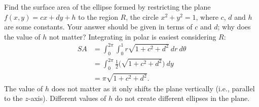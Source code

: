 {Find the surface area of the ellipse formed by restricting the plane $f(x,y) = cx+dy+h$ to the region $R$, the circle $x^2+y^2=1$, where $c$, $d$ and $h$ are some constants. Your answer should be given in terms of $c$ and $d$; why does the value of $h$ not matter?
}
{Integrating in polar is easiest considering $R$:
\begin{align*}SA &= \int_{0}^{2\pi}\int_{0}^{1} r\sqrt{1+ c^2+d^2}\ dr\ d\theta\\
		&= \int_0^{2\pi}\frac12\Big(\sqrt{1+c^2+d^2}\Big)\ dy \\
		&= \pi\sqrt{1+c^2+d^2}.
\end{align*}
The value of $h$ does not matter as it only shifts the plane vertically (i.e., parallel to the $z$-axis). Different values of $h$ do not create different ellipses in the plane.
}